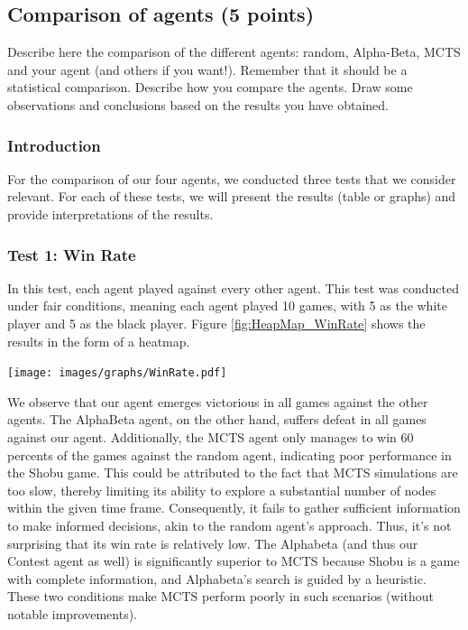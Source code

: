 \documentclass[11pt,a4paper]{report}
\begin{document}
\newpage
\subsection{Comparison of agents (5 points)}
Describe here the comparison of the different agents: random, Alpha-Beta, MCTS and your agent (and others if you want!). Remember that it should be a statistical comparison. Describe how you compare the agents. Draw some observations and conclusions based on the results you have obtained.

\begin{answers}[20cm]

\subsubsection{Introduction}
For the comparison of our four agents, we conducted three tests that we consider relevant. For each of these tests, we will present the results (table or graphs) and provide interpretations of the results.

\subsubsection{Test 1: Win Rate}
In this test, each agent played against every other agent. This test was conducted under fair conditions, meaning each agent played 10 games, with 5 as the white player and 5 as the black player. Figure \ref{fig:HeapMap_WinRate} shows the results in the form of a heatmap.

\begin{center}
\texttt{[image: images/graphs/WinRate.pdf]}
\label{fig:HeapMap_WinRate}
\end{center}

We observe that our agent emerges victorious in all games against the other agents. The AlphaBeta agent, on the other hand, suffers defeat in all games against our agent. Additionally, the MCTS agent only manages to win 60 percents of the games against the random agent, indicating poor performance in the Shobu game. This could be attributed to the fact that MCTS simulations are too slow, thereby limiting its ability to explore a substantial number of nodes within the given time frame. Consequently, it fails to gather sufficient information to make informed decisions, akin to the random agent's approach. Thus, it's not surprising that its win rate is relatively low. The Alphabeta (and thus our Contest agent as well) is significantly superior to MCTS because Shobu is a game with complete information, and Alphabeta's search is guided by a heuristic. These two conditions make MCTS perform poorly in such scenarios (without notable improvements).

\end{answers}
\end{document}
